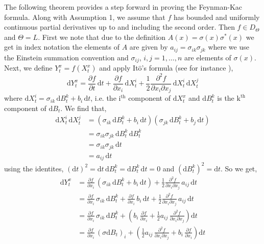 \documentclass[a4paper,12pt,draft]{report}
\theoremstyle{remark}
\theoremstyle{definition}
\begin{document}
The following theorem provides a step forward in proving the Feynman-Kac formula.
\theorem
{
Along with Assumption 1, we assume that $f$ has bounded and uniformly continuous partial derivatives up to and including the second order.  Then $f \in D_\Theta$ and $\Theta = L$.
}
\proof
{
First we note that due to the definition $A(x) = \sigma(x)\sigma^*(x)$ we get in index notation the elements of $A$ are given by $a_{ij} = \sigma_{ik}\sigma_{jk}$ where we use the Einstein summation convention and $\sigma_{ij}$, $i, j = 1, \dots, n$ are elements of $\sigma(x)$.  Next, we define $Y_t^x = f(X_t^x)$ and apply It$\mathrm{\hat{o}}$'s formula (see for instance \cite{Oksendal}),
$$
\mathrm{d}Y_t^x = \frac{\partial f}{\partial t}\,\mathrm{d}t + \frac{\partial f}{\partial x_i}\,\mathrm{d}X_t^i + \frac{1}{2}\frac{\partial^2 f}{\partial x_i \partial x_j}\,\mathrm{d}X_t^i\,\mathrm{d}X_t^j
$$
where $\mathrm{d}X_t^i = \sigma_{ik}\,\mathrm{d}B_t^k + b_i\,\mathrm{d}t$, i.e. the $\mathrm{i^{th}}$ component of $\mathrm{d}X_t^x$ and $\mathrm{d}B_t^k$ is the $\mathrm{k^{th}}$ component of $\mathrm{d}B_t$.  We find that,
\begin{align}
\mathrm{d}X_t^i\,\mathrm{d}X_t^j & = (\sigma_{ik}\,\mathrm{d}B_t^k + b_i\,\mathrm{d}t)(\sigma_{jk}\,\mathrm{d}B_t^k + b_j\,\mathrm{d}t)\nonumber\\
& = \sigma_{ik}\sigma_{jk}\,\mathrm{d}B_t^k\,\mathrm{d}B_t^k\nonumber\\
& = \sigma_{ik}\sigma_{jk}\,\mathrm{d}t\nonumber\\
& = a_{ij}\,\mathrm{d}t\nonumber
\end{align}
using the identites, $(\mathrm{d}t)^2 = \mathrm{d}t\,\mathrm{d}B_t^k = \mathrm{d}B_t^k\,\mathrm{d}t = 0$ and $(\mathrm{d}B_t^k)^2 = \mathrm{d}t$.  So we get,
\begin{align}
\mathrm{d}Y_t^x & = \frac{\partial f}{\partial x_i}\,(\sigma_{ik}\,\mathrm{d}B_t^k + b_i\,\mathrm{d}t) + \frac{1}{2}\frac{\partial^2 f}{\partial x_i \partial x_j}\,a_{ij}\,\mathrm{d}t\nonumber\\
& = \frac{\partial f}{\partial x_i}\,\sigma_{ik}\,\mathrm{d}B_t^k + \frac{\partial f}{\partial x_i}\,b_i\,\mathrm{d}t + \frac{1}{2}\frac{\partial^2 f}{\partial x_i \partial x_j}\,a_{ij}\,\mathrm{d}t\nonumber\\
& = \frac{\partial f}{\partial x_i}\,\sigma_{ik}\,\mathrm{d}B_t^k + \left(b_i\,\frac{\partial f}{\partial x_i} + \frac{1}{2}a_{ij}\,\frac{\partial^2 f}{\partial x_i \partial x_j}\right)\mathrm{d}t\nonumber\\
& = \frac{\partial f}{\partial x_i}\,(\sigma\mathrm{d}B_t)_i + \left(\frac{1}{2}a_{ij}\,\frac{\partial^2 f}{\partial x_i \partial x_j} + b_i\,\frac{\partial f}{\partial x_i}\right)\mathrm{d}t\nonumber\\

\end{align}}
\end{document}
